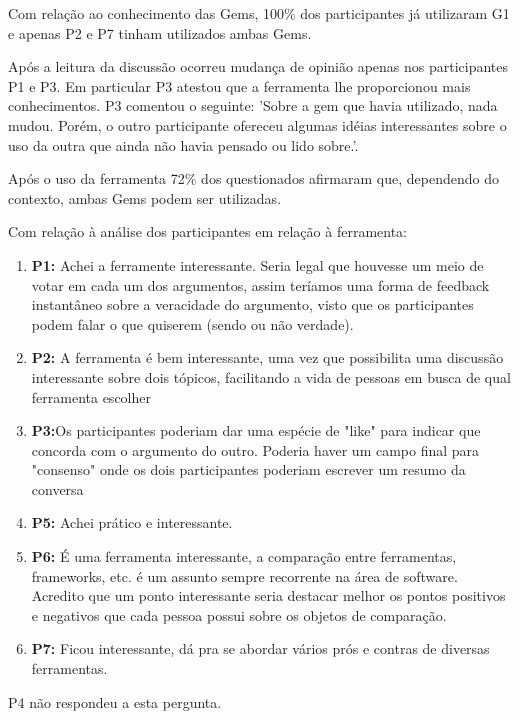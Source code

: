 Com relação ao conhecimento das Gems, 100\% dos participantes já utilizaram G1 e apenas P2 e P7 tinham utilizados ambas Gems.

Após a leitura da discussão ocorreu mudança de opinião apenas nos participantes P1 e P3. Em particular P3 atestou que a ferramenta lhe proporcionou mais conhecimentos. P3 comentou o seguinte: 'Sobre a gem que havia utilizado, nada mudou. Porém, o outro participante ofereceu algumas idéias interessantes sobre o uso da outra que ainda não havia pensado ou lido sobre.'.

Após o uso da ferramenta 72\% dos questionados afirmaram que, dependendo do contexto, ambas Gems podem ser utilizadas.

Com relação à análise dos participantes em relação à ferramenta:
\begin{enumerate}
  \item \textbf{P1:} Achei a ferramente interessante. Seria legal que houvesse um meio de votar em cada um dos argumentos, assim teríamos uma forma de feedback instantâneo sobre a veracidade do argumento, visto que os participantes podem falar o que quiserem (sendo ou não verdade).
  \item \textbf{P2:} A ferramenta é bem interessante, uma vez que possibilita uma discussão interessante sobre dois tópicos, facilitando a vida de pessoas em busca de qual ferramenta escolher
  \item \textbf{P3:}Os participantes poderiam dar uma espécie de "like" para indicar que concorda com o argumento do outro. Poderia haver um campo final para "consenso" onde os dois participantes poderiam escrever um resumo da conversa
  \item \textbf{P5:} Achei prático e interessante. 
  \item \textbf{P6:} É uma ferramenta interessante, a comparação entre ferramentas, frameworks, etc. é um assunto sempre recorrente na área de software. Acredito que um ponto interessante seria destacar melhor os pontos positivos e negativos que cada pessoa possui sobre os objetos de comparação.
  \item \textbf{P7:} Ficou interessante, dá pra se abordar vários prós e contras de diversas ferramentas.
\end{enumerate}

P4 não respondeu a esta pergunta.